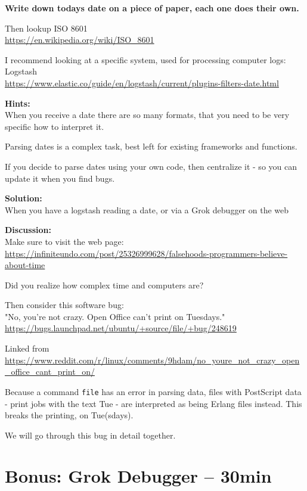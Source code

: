 \documentclass[a4paper,11pt,notitlepage]{report}
\begin{document}
{\bf Write down todays date on a piece of paper, each one does their own.}

Then lookup ISO 8601\\
\url{https://en.wikipedia.org/wiki/ISO_8601}

I recommend looking at a specific system, used for processing computer logs:
Logstash \\
\url{https://www.elastic.co/guide/en/logstash/current/plugins-filters-date.html}


{\bf Hints:}\\
When you receive a date there are so many formats, that you need to be very specific how to interpret it.

Parsing dates is a complex task, best left for existing frameworks and functions.

If you decide to parse dates using your own code, then centralize it - so you can update it when you find bugs.

{\bf Solution:}\\
When you have a logstash reading a date, or via a Grok debugger on the web

{\bf Discussion:}\\
Make sure to visit the web page:\\
\url{https://infiniteundo.com/post/25326999628/falsehoods-programmers-believe-about-time}

Did you realize how complex time and computers are?

Then consider this software bug:\\
"No, you're not crazy. Open Office can't print on Tuesdays."\\
\url{https://bugs.launchpad.net/ubuntu/+source/file/+bug/248619}

Linked from\\
{\footnotesize\url{https://www.reddit.com/r/linux/comments/9hdam/no_youre_not_crazy_open_office_cant_print_on/}}

Because a command \verb+file+ has an error in parsing data, files with PostScript data - print jobs with the text Tue - are interpreted as being Erlang files instead. This breaks the printing, on Tue(sdays).

We will go through this bug in detail together.


\chapter{Bonus: Grok Debugger -- 30min}
\label{ex:grokdebugger1}
\end{document}
